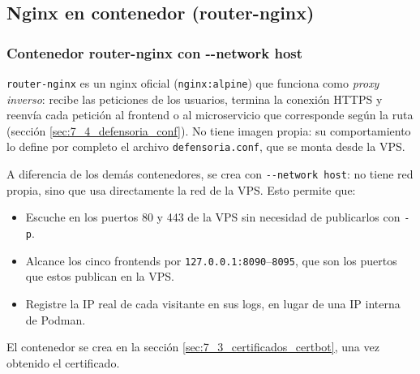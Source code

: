 \subsection{Nginx en contenedor (router-nginx)}\label{sec:7_1_router_nginx}

\subsubsection{Contenedor router-nginx con -{}-network host}
\texttt{router-nginx} es un nginx oficial (\texttt{nginx:alpine}) que funciona como \emph{proxy inverso}: recibe las peticiones de los usuarios, termina la conexión HTTPS y reenvía cada petición al frontend o al microservicio que corresponde según la ruta (sección \ref{sec:7_4_defensoria_conf}). No tiene imagen propia: su comportamiento lo define por completo el archivo \texttt{defensoria.conf}, que se monta desde la VPS.

A diferencia de los demás contenedores, se crea con \texttt{-{}-network host}: no tiene red propia, sino que usa directamente la red de la VPS. Esto permite que:
\begin{itemize}
  \item Escuche en los puertos 80 y 443 de la VPS sin necesidad de publicarlos con \texttt{-p}.
  \item Alcance los cinco frontends por \texttt{127.0.0.1:8090}--\texttt{8095}, que son los puertos que estos publican en la VPS.
  \item Registre la IP real de cada visitante en sus logs, en lugar de una IP interna de Podman.
\end{itemize}
El contenedor se crea en la sección \ref{sec:7_3_certificados_certbot}, una vez obtenido el certificado.

